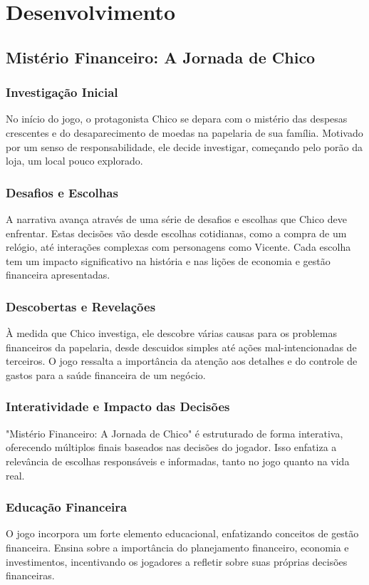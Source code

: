 \chapter{Desenvolvimento}

\section{Mistério Financeiro: A Jornada de Chico}

\subsection{Investigação Inicial}
No início do jogo, o protagonista Chico se depara com o mistério das despesas crescentes e do desaparecimento de moedas na papelaria de sua família. Motivado por um senso de responsabilidade, ele decide investigar, começando pelo porão da loja, um local pouco explorado.

\subsection{Desafios e Escolhas}
A narrativa avança através de uma série de desafios e escolhas que Chico deve enfrentar. Estas decisões vão desde escolhas cotidianas, como a compra de um relógio, até interações complexas com personagens como Vicente. Cada escolha tem um impacto significativo na história e nas lições de economia e gestão financeira apresentadas.

\subsection{Descobertas e Revelações}
À medida que Chico investiga, ele descobre várias causas para os problemas financeiros da papelaria, desde descuidos simples até ações mal-intencionadas de terceiros. O jogo ressalta a importância da atenção aos detalhes e do controle de gastos para a saúde financeira de um negócio.

\subsection{Interatividade e Impacto das Decisões}
"Mistério Financeiro: A Jornada de Chico" é estruturado de forma interativa, oferecendo múltiplos finais baseados nas decisões do jogador. Isso enfatiza a relevância de escolhas responsáveis e informadas, tanto no jogo quanto na vida real.

\subsection{Educação Financeira}
O jogo incorpora um forte elemento educacional, enfatizando conceitos de gestão financeira. Ensina sobre a importância do planejamento financeiro, economia e investimentos, incentivando os jogadores a refletir sobre suas próprias decisões financeiras.

